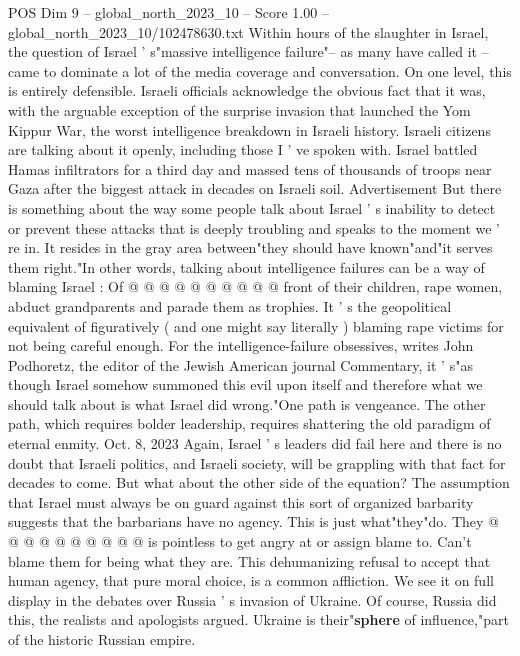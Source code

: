 \begin{textsample}{POS Dim 9 – global\_north\_2023\_10 – Score 1.00 – global\_north\_2023\_10/102478630.txt}  \label{ex:f9_pos_310}
Within hours of the slaughter in Israel, the question of Israel ' s"massive intelligence failure"-- as many have called it -- came to dominate a lot of the media coverage and conversation.
On one level, this is entirely defensible.
Israeli officials acknowledge the obvious fact that it was, with the arguable exception of the surprise invasion that launched the Yom Kippur War, the worst intelligence breakdown in Israeli history.
Israeli citizens are talking about it openly, including those I ' ve spoken with.
Israel battled Hamas infiltrators for a third day and massed tens of thousands of troops near Gaza after the biggest attack in decades on Israeli soil.
Advertisement But there is something about the way some people talk about Israel ' s inability to detect or prevent these attacks that is deeply troubling and speaks to the moment we ' re in.
It resides in the gray area between"they should have known"and"it serves them right."In other words, talking about intelligence failures can be a way of blaming Israel : Of @ @ @ @ @ @ @ @ @ @ front of their children, rape women, abduct grandparents and parade them as trophies.
It ' s the geopolitical equivalent of figuratively ( and one might say literally ) blaming rape victims for not being careful enough.
For the intelligence-failure obsessives, writes John Podhoretz, the editor of the Jewish American journal Commentary, it ' s"as though Israel somehow summoned this evil upon itself and therefore what we should talk about is what Israel did wrong."One path is vengeance.
The other path, which requires bolder leadership, requires shattering the old paradigm of eternal enmity.
Oct. 8, 2023 Again, Israel ' s leaders did fail here and there is no doubt that Israeli politics, and Israeli society, will be grappling with that fact for decades to come.
But what about the other side of the equation?
The assumption that Israel must always be on guard against this sort of organized barbarity suggests that the barbarians have no agency.
This is just what"they"do.
They @ @ @ @ @ @ @ @ @ @ is pointless to get angry at or assign blame to.
Can't blame them for being what they are.
This dehumanizing refusal to accept that human agency, that pure moral choice, is a common affliction.
We see it on full display in the debates over Russia ' s invasion of Ukraine.
Of course, Russia did this, the realists and apologists argued.
Ukraine is their"\textbf{sphere} of influence,"part of the historic Russian empire.

\end{textsample}
